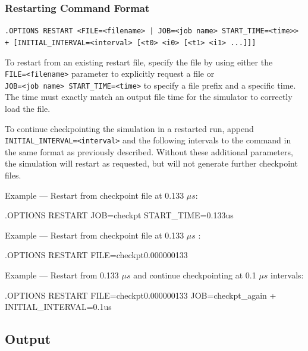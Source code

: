 \subsubsection{Restarting Command Format}

\begin{XyceItemize}
\item {}
\verb+.OPTIONS RESTART <FILE=<filename> | JOB=<job name> START_TIME=<time>>+ \\
\verb|+ [INITIAL_INTERVAL=<interval> [<t0> <i0> [<t1> <i1> ...]]]|
\end{XyceItemize}
To restart from an existing restart file, specify the file by using either the\\%
\texttt{FILE=<filename>} parameter to explicitly request a file or\\%
\texttt{JOB=<job name> START\_TIME=<time>} to specify a file prefix and a
specific time.  The time must exactly match an output file time for the
simulator to correctly load the file.  

To continue checkpointing the simulation in a restarted run, append
\texttt{INITIAL\_INTERVAL=<interval>} and the following intervals to
the command in the same format as previously described.  Without these
additional parameters, the simulation will restart as requested, but
will not generate further checkpoint files.

\begin{XyceItemize}
\item Example --- Restart from checkpoint file at 0.133
  $\mu s$:
\begin{vquote}
.OPTIONS RESTART JOB=checkpt START_TIME=0.133us
\end{vquote}
\item Example --- Restart from checkpoint file at 0.133 $\mu s$ :
\begin{vquote}
.OPTIONS RESTART FILE=checkpt0.000000133
\end{vquote}
\item Example --- Restart from 0.133 $\mu s$ and continue checkpointing at 0.1
      $\mu s$ intervals:
\begin{vquote}
.OPTIONS RESTART FILE=checkpt0.000000133 JOB=checkpt_again
+ INITIAL_INTERVAL=0.1us
\end{vquote}
\end{XyceItemize}
\subsection{Output}
\label{Transient_Output}


